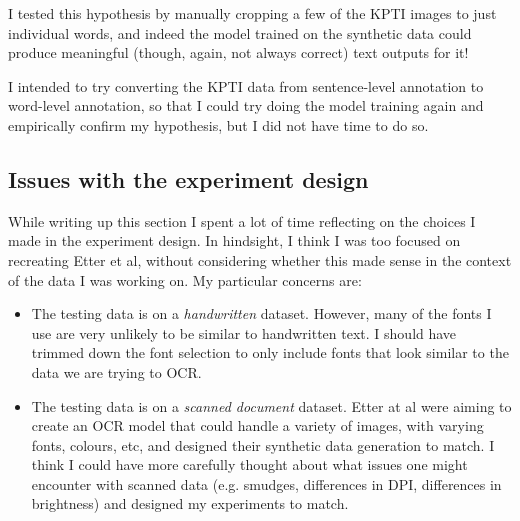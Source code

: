 \documentclass[twocolumn,11pt]{extarticle}
\begin{document}
I tested this hypothesis by manually cropping a few of the KPTI images to just individual words, and indeed the model trained on the synthetic data could produce meaningful (though, again, not always correct) text outputs for it! 

I intended to try converting the KPTI data from sentence-level annotation to word-level annotation, so that I could try doing the model training again and empirically confirm my hypothesis, but I did not have time to do so.

\subsection{Issues with the experiment design}

While writing up this section I spent a lot of time reflecting on the choices I made in the experiment design. In hindsight, I think I was too focused on recreating Etter et al, without considering whether this made sense in the context of the data I was working on. My particular concerns are:
\begin{itemize}
    \item The testing data is on a \textit{handwritten} dataset. However, many of the fonts I use are very unlikely to be similar to handwritten text. I should have trimmed down the font selection to only include fonts that look similar to the data we are trying to OCR.
    \item The testing data is on a \textit{scanned document} dataset. Etter at al were aiming to create an OCR model that could handle a variety of images, with varying fonts, colours, etc, and designed their synthetic data generation to match. I think I could have more carefully thought about what issues one might encounter with scanned data (e.g. smudges, differences in DPI, differences in brightness) and designed my experiments to match.
\end{itemize}
\end{document}
